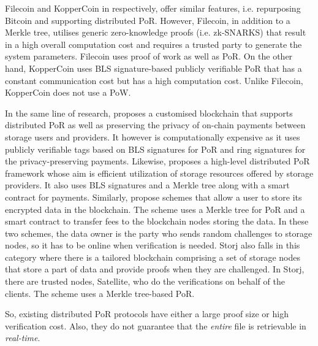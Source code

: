 Filecoin and KopperCoin in \cite{Filecoin,KoppBK16} respectively, offer  similar features, i.e. repurposing Bitcoin and supporting distributed PoR.  However, Filecoin, in addition to a Merkle tree, utilises  generic zero-knowledge proofs (i.e. zk-SNARKS) that result in a high  overall computation  cost and requires a trusted party to generate the system parameters. Filecoin uses proof of work as well as PoR. On the other hand, 
 KopperCoin uses BLS signature-based publicly verifiable PoR that has a constant communication cost but has a high computation cost. Unlike Filecoin, KopperCoin does not use a PoW. 

In the same line of research, \cite{KoppMHKB17} proposes a customised blockchain  that supports distributed PoR as well as  preserving the privacy of on-chain payments between storage users and providers. It however is computationally expensive as it uses publicly verifiable  tags based on  BLS signatures for PoR and ring signatures for the privacy-preserving payments.  Likewise, \cite{RujRBK18} proposes a high-level distributed PoR framework whose aim is efficient utilization of  storage resources offered by storage providers. It also uses BLS signatures and a Merkle tree along with a smart contract  for payments. Similarly, \cite{XueX0B18,XueXB19} propose  schemes that allow a user to store its encrypted data in the blockchain. The scheme uses a Merkle tree  for PoR   and a smart contract to transfer fees to the blockchain nodes storing  the data. In these two schemes, the data owner  is the party who sends random challenges  to  storage nodes, so it has to be  online when  verification is needed. Storj \cite{storj14} also falls in this category where there is a tailored blockchain comprising a set of storage nodes that store a part of data and provide  proofs when they are challenged. In Storj, there are trusted nodes, Satellite, who do the verifications on behalf of the clients.  The scheme uses a Merkle tree-based   PoR. 

So,  existing distributed PoR protocols have either a large proof size or  high verification cost. Also,  they do not guarantee  that the \emph{entire} file is retrievable in  \emph{real-time}. 



